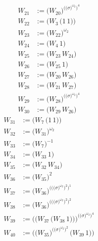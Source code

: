 \begin{align*}
W_{21} &:= \bigl(W_{20}\bigr)^{\bigl(\bigl(\sigma\bigr)^{\omega_2}\bigr)^{4}} \\
W_{22} &:= \bigl(W_{3}\,\bigl(1\,1\bigr)\bigr) \\
W_{23} &:= \bigl(W_{22}\bigr)^{\omega_2} \\
W_{24} &:= \bigl(W_{4}\,1\bigr) \\
W_{25} &:= \bigl(W_{23}\,W_{24}\bigr) \\
W_{26} &:= \bigl(W_{25}\,1\bigr) \\
W_{27} &:= \bigl(W_{20}\,W_{26}\bigr) \\
W_{28} &:= \bigl(W_{21}\,W_{27}\bigr) \\
W_{29} &:= \bigl(W_{28}\bigr)^{\bigl(\bigl(\sigma\bigr)^{\omega_2}\bigr)^{4}} \\
W_{30} &:= \bigl(W_{29}\,W_{26}\bigr)
\end{align*}
\begin{align*}
W_{31} &:= \bigl(W_{7}\,\bigl(1\,1\bigr)\bigr) \\
W_{32} &:= \bigl(W_{31}\bigr)^{\omega_2} \\
W_{33} &:= \bigl(W_{7}\bigr)^{-1} \\
W_{34} &:= \bigl(W_{33}\,1\bigr) \\
W_{35} &:= \bigl(W_{32}\,W_{34}\bigr) \\
W_{36} &:= \bigl(W_{35}\bigr)^{2} \\
W_{37} &:= \bigl(W_{36}\bigr)^{\bigl(\bigl(\bigl(\sigma\bigr)^{\omega_2}\bigr)^{2}\bigr)^{1}} \\
W_{38} &:= \bigl(W_{36}\bigr)^{\bigl(\bigl(\bigl(\sigma\bigr)^{\omega_2}\bigr)^{2}\bigr)^{2}} \\
W_{39} &:= \bigl(\bigl(W_{37}\,\bigl(W_{38}\,1\bigr)\bigr)\bigr)^{\bigl(\bigl(\sigma\bigr)^{\omega_2}\bigr)^{4}} \\
W_{40} &:= \bigl(\bigl(W_{35}\bigr)^{\bigl(\bigl(\sigma\bigr)^{\omega_2}\bigr)^{2}}\,\bigl(W_{39}\,1\bigr)\bigr)
\end{align*}
